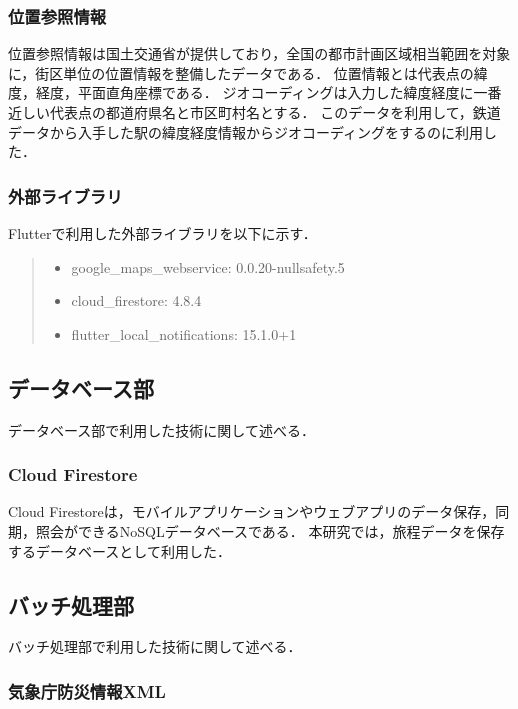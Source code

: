 \subsubsection{位置参照情報}
位置参照情報\cite{Geocoding}は国土交通省が提供しており，全国の都市計画区域相当範囲を対象に，街区単位の位置情報を整備したデータである．
位置情報とは代表点の緯度，経度，平面直角座標である．
ジオコーディングは入力した緯度経度に一番近しい代表点の都道府県名と市区町村名とする．
このデータを利用して，鉄道データから入手した駅の緯度経度情報からジオコーディングをするのに利用した．

\subsubsection{外部ライブラリ}
Flutterで利用した外部ライブラリを以下に示す．

\begin{quote}
  \begin{itemize}
    \item google\_maps\_webservice: 0.0.20-nullsafety.5
    \item cloud\_firestore: 4.8.4
    \item flutter\_local\_notifications: 15.1.0+1
  \end{itemize}
\end{quote}

\subsection{データベース部}
データベース部で利用した技術に関して述べる．

\subsubsection{Cloud Firestore}

Cloud Firestore\cite{Firebase}は，モバイルアプリケーションやウェブアプリのデータ保存，同期，照会ができるNoSQLデータベースである．
本研究では，旅程データを保存するデータベースとして利用した．

\subsection{バッチ処理部}
バッチ処理部で利用した技術に関して述べる．

\subsubsection{気象庁防災情報XML}


